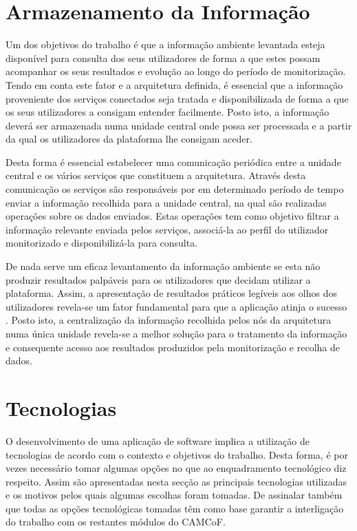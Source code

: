 \section{Armazenamento da Informação}

Um dos objetivos do trabalho é que a informação ambiente levantada esteja disponível para consulta dos seus utilizadores de forma a que estes possam acompanhar os seus resultados e evolução ao longo do período de monitorização. Tendo em conta este fator e a arquitetura definida, é essencial que a informação proveniente dos serviços conectados seja tratada e disponibilizada de forma a que os seus utilizadores a consigam entender facilmente. Posto isto, a informação deverá ser armazenada numa unidade central onde possa ser processada e a partir da qual os utilizadores da plataforma lhe consigam aceder.

Desta forma é essencial estabelecer uma comunicação periódica entre a unidade central e os vários serviços que constituem a arquitetura. Através desta comunicação os serviços são responsáveis por em determinado período de tempo enviar a informação recolhida para a unidade central, na qual são realizadas operações sobre os dados enviados. Estas operações tem como objetivo filtrar a informação relevante enviada pelos serviços, associá-la ao perfil do utilizador monitorizado e disponibilizá-la para consulta. 

De nada serve um eficaz levantamento da informação ambiente se esta não produzir resultados palpáveis para os utilizadores que decidam utilizar a plataforma. Assim, a apresentação de resultados práticos legíveis aos olhos dos utilizadores revela-se um fator fundamental para que a aplicação atinja o sucesso \cite{fernandes1995global}. Posto isto, a centralização da informação recolhida pelos nós da arquitetura numa única unidade revela-se a melhor solução para o tratamento da informação e consequente acesso aos resultados produzidos pela monitorização e recolha de dados.



\section{Tecnologias}

O desenvolvimento de uma aplicação de software implica a utilização de tecnologias de acordo com o contexto e objetivos do trabalho. Desta forma, é por vezes necessário tomar algumas opções no que ao enquadramento tecnológico diz respeito. Assim são apresentadas nesta secção as principais tecnologias utilizadas e os motivos pelos quais algumas escolhas foram tomadas. De assinalar também que todas as opções tecnológicas tomadas têm como base garantir a interligação do trabalho com os restantes módulos do CAMCoF.

